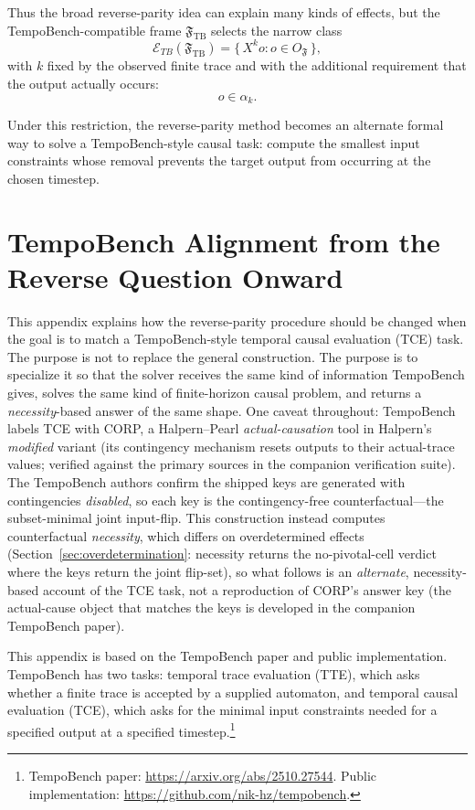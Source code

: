\documentclass[11pt]{article}
\theoremstyle{remark}
\newcommand{\Frame}{\mathfrak{F}}
\begin{document}
Thus the broad reverse-parity idea can explain many kinds of effects, but the
TempoBench-compatible frame \(\Frame_{\mathrm{TB}}\) selects the narrow class
\[
\boxed{
  \mathcal{E}_{TB}(\Frame_{\mathrm{TB}}) = \{\,X^k o : o\in O_{\Frame}\,\},
}
\]
with \(k\) fixed by the observed finite trace and with the additional
requirement that the output actually occurs:
\[
  o\in\alpha_k.
\]

Under this restriction, the reverse-parity method becomes an alternate formal
way to solve a TempoBench-style causal task: compute the smallest input
constraints whose removal prevents the target output from occurring at the
chosen timestep.

\section{TempoBench Alignment from the Reverse Question Onward}
\label{app:tempobench-alignment}

This appendix explains how the reverse-parity procedure should be changed when
the goal is to match a TempoBench-style temporal causal evaluation (TCE)
task. The purpose is not to replace the general construction. The purpose is to
specialize it so that the solver receives the same kind of information
TempoBench gives, solves the same kind of finite-horizon causal problem, and
returns a \emph{necessity}-based answer of the same shape. One caveat throughout:
TempoBench labels TCE with CORP, a Halpern--Pearl \emph{actual-causation} tool in
Halpern's \emph{modified} variant (its contingency mechanism resets outputs to
their actual-trace values; verified against the primary sources in the companion
verification suite). The TempoBench authors confirm the shipped keys are generated
with contingencies \emph{disabled}, so each key is the contingency-free
counterfactual---the subset-minimal joint input-flip. This construction instead
computes counterfactual \emph{necessity}, which differs on overdetermined effects
(Section~\ref{sec:overdetermination}: necessity returns the no-pivotal-cell verdict
where the keys return the joint flip-set), so what follows is an \emph{alternate},
necessity-based account of the TCE task, not a reproduction of CORP's answer key
(the actual-cause object that matches the keys is developed in the companion
TempoBench paper).

This appendix is based on the TempoBench paper and public implementation.
TempoBench has two tasks: temporal trace evaluation (TTE), which asks whether a
finite trace is accepted by a supplied automaton, and temporal causal
evaluation (TCE), which asks for the minimal input constraints needed for a
specified output at a specified timestep.\footnote{TempoBench paper:
\url{https://arxiv.org/abs/2510.27544}. Public implementation:
\url{https://github.com/nik-hz/tempobench}.}
\end{document}
